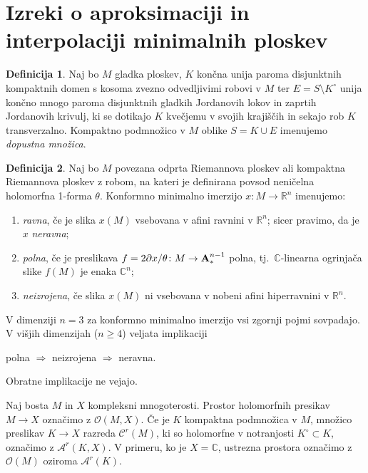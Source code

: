 \documentclass[12pt,a4paper,twoside]{article}
\theoremstyle{definition} %
\newtheorem{definicija}{Definicija}[section]
\theoremstyle{plain} %
\numberwithin{equation}{section}  %
\newcommand{\R}{\mathbb R}
\newcommand{\C}{\mathbb C}
\begin{document}
\section{Izreki o aproksimaciji in interpolaciji minimalnih ploskev}

\begin{definicija}
Naj bo $M$ gladka ploskev, $K$ končna unija paroma disjunktnih kompaktnih domen s kosoma zvezno odvedljivimi robovi v $M$ ter $E = S \setminus K^\circ$ unija končno mnogo paroma disjunktnih gladkih Jordanovih lokov in zaprtih Jordanovih krivulj, ki se dotikajo $K$ kvečjemu v svojih krajiščih in sekajo rob $K$ transverzalno. Kompaktno podmnožico v $M$ oblike $S = K \cup E$ imenujemo \emph{dopustna množica}.
\end{definicija}

\begin{definicija}
Naj bo $M$ povezana odprta Riemannova ploskev ali kompaktna Riemannova ploskev z robom, na kateri je definirana povsod neničelna holomorfna 1-forma $\theta$. Konformno minimalno imerzijo $x \colon M \to \R^{n}$ imenujemo:
\begin{enumerate}
\item \emph{ravna}, če je slika $x(M)$ vsebovana v afini ravnini v $\R^{n}$; sicer pravimo, da je $x$ \emph{neravna};
\item \emph{polna}, če je preslikava $f = 2 \partial{x} / \theta \colon M \to \textbf{\textup{A}}_{*}^{n-1}$ polna, tj.\ $\C$-linearna ogrinjača slike $f(M)$ je enaka $\C^{n}$;
\item \emph{neizrojena}, če slika $x(M)$ ni vsebovana v nobeni afini hiperravnini v $\R^{n}$. 
\end{enumerate}
\end{definicija}

V dimenziji  $n=3$ za konformno minimalno imerzijo vsi zgornji pojmi sovpadajo. V višjih dimenzijah ($n \geq 4$) veljata implikaciji
\begin{center}
polna $\Rightarrow$ neizrojena $\Rightarrow$ neravna.
\end{center}
Obratne implikacije ne vejajo.

Naj bosta $M$ in $X$ kompleksni mnogoterosti. Prostor holomorfnih presikav $M \to X$ označimo z $\mathcal{O}(M,X)$.
Če je $K$ kompaktna podmnožica v $M$, množico preslikav $K \to X$ razreda $\mathcal{C}^{r}(M)$, ki so holomorfne v notranjosti $K^\circ \subset K$, označimo z $\mathcal{A}^{r}(K,X)$.
V primeru, ko je $X = \C$, ustrezna prostora označimo z $\mathcal{O}(M)$ oziroma $\mathcal{A}^{r}(K)$.
\end{document}
